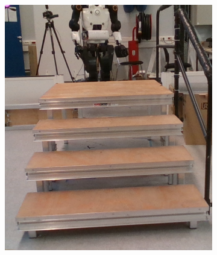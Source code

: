 \begin{figure}[h]
    \centering
    \begin{subfigure}[]{{.33\linewidth}}
        \centering
        \includegraphics[width=\textwidth]{figures/cosyslam/0006.png} 
    \end{subfigure}
    \hspace{2cm}
    \begin{subfigure}[]{{.33\linewidth}}
        \centering

\end{subfigure}
\end{figure}
